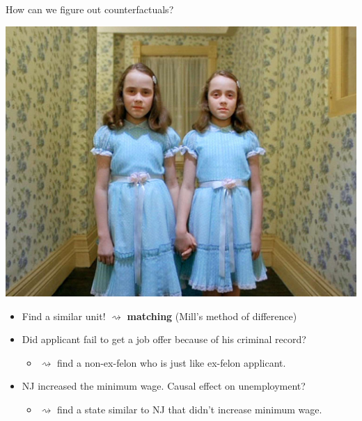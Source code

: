 \documentclass[
  ignorenonframetext,
]{beamer}
\providecommand{\tightlist}{%
  \setlength{\itemsep}{0pt}\setlength{\parskip}{0pt}}
\begin{document}
\begin{frame}{How can we figure out counterfactuals?}
\label{how-can-we-figure-out-counterfactuals}
\begin{center}
\includegraphics[width=.4\textwidth]{figs/shining.jpg}
\end{center}

\begin{itemize}
\tightlist
\item
  Find a similar unit! \(\rightsquigarrow\) \textbf{matching} (Mill's
  method of difference) \pause
\item
  Did applicant fail to get a job offer because of his criminal record?
  \pause

  \begin{itemize}
  \tightlist
  \item
    \(\rightsquigarrow\) find a non-ex-felon who is just like ex-felon
    applicant. \pause
  \end{itemize}
\item
  NJ increased the minimum wage. Causal effect on unemployment? \pause

  \begin{itemize}
  \tightlist
  \item
    \(\rightsquigarrow\) find a state similar to NJ that didn't increase
    minimum wage.
  \end{itemize}
\end{itemize}
\end{frame}
\end{document}
